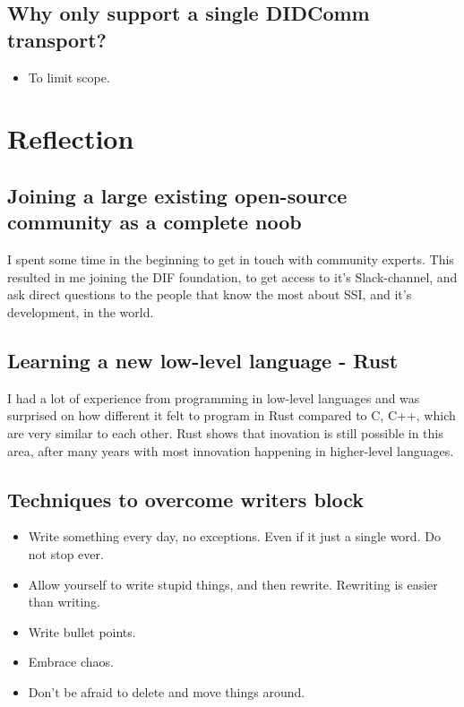 \subsection{Why only support a single DIDComm transport?}
\begin{itemize}
    \item To limit scope.
\end{itemize}








\section{Reflection}

\subsection{Joining a large existing open-source community as a complete noob}

I spent some time in the beginning to get in touch with community experts. This resulted in me joining the DIF foundation, to get access to it's Slack-channel, and ask direct questions to the people that know the most about SSI, and it's development, in the world.

\subsection{Learning a new low-level language - Rust}

I had a lot of experience from programming in low-level languages and was surprised on how different it felt to program in Rust compared to C, C++, which are very similar to each other. Rust shows that inovation is still possible in this area, after many years with most innovation happening in higher-level languages.

\subsection{Techniques to overcome writers block}
\begin{itemize}
    \item Write something every day, no exceptions. Even if it just a single word. Do not stop ever.
    \item Allow yourself to write stupid things, and then rewrite. Rewriting is easier than writing.
    \item Write bullet points.
    \item Embrace chaos.
    \item Don't be afraid to delete and move things around.
\end{itemize}



